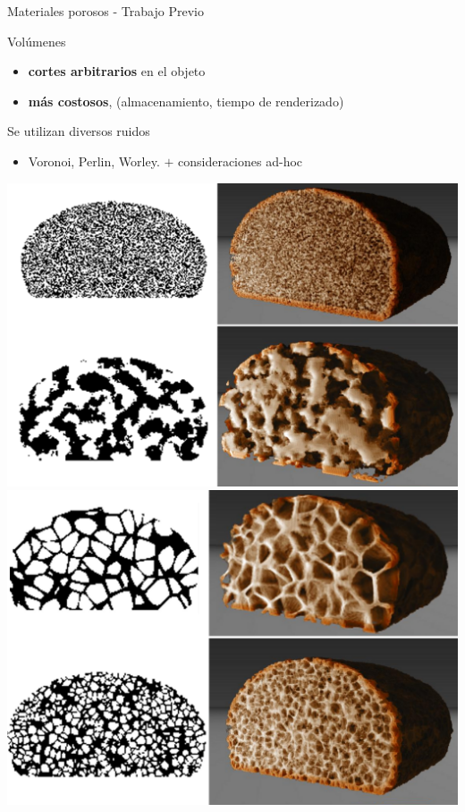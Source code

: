 \documentclass[spanish,unknownkeysallowed]{beamer}
\begin{document}
\begin{frame}{Materiales porosos - Trabajo Previo}

Volúmenes
\begin{block}{}
\begin{itemize}
\item \textbf{cortes arbitrarios} en el objeto
\item \textbf{más costosos}, (almacenamiento, tiempo de renderizado)
\end{itemize}
\end{block}

Se utilizan diversos ruidos

\begin{itemize}
\item Voronoi, Perlin, Worley. $+$ consideraciones ad-hoc
\end{itemize}

\includegraphics[scale = 0.15]{../figures/Fig8}
\includegraphics[scale = 0.15]{../figures/Fig9CAVW}
\end{frame}
\end{document}
